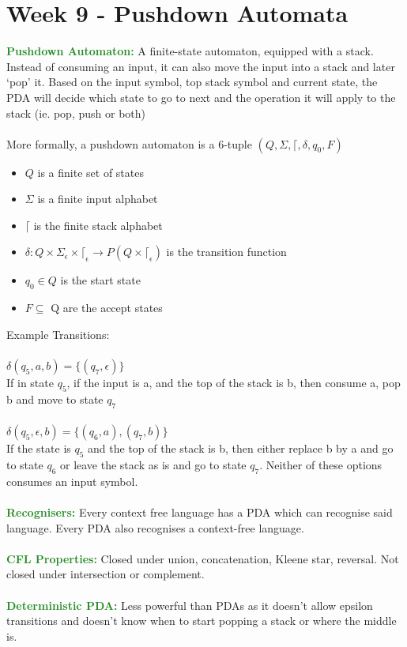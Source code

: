 \documentclass[a4paper,10pt]{article}
\begin{document}
\section*{Week 9 - Pushdown Automata}
\textcolor{ForestGreen}{\textbf{Pushdown Automaton:}} A finite-state automaton, equipped with a stack. Instead of consuming an input, it can also move the input into a stack and later `pop' it. Based on the input symbol, top stack symbol and current state, the PDA will decide which state to go to next and the operation it will apply to the stack (ie. pop, push or both) \\\\
More formally, a pushdown automaton is a 6-tuple $(Q, \Sigma, \lceil, \delta, q_{0}, F)$
\renewcommand{\labelitemi}{\textperiodcentered}
\begin{itemize}
\item $Q$ is a finite set of states 
\item $\Sigma$ is a finite input alphabet 
\item $\lceil$ is the finite stack alphabet 
\item $\delta: Q \times \Sigma_{\epsilon} \times \lceil_{\epsilon} \rightarrow P(Q \times \lceil_{\epsilon})$ is the transition function 
\item $q_{0} \in Q$ is the start state 
\item $F \subseteq$ Q are the accept states \\
\end{itemize}
Example Transitions: \\\\
$\delta(q_{5}, a, b) = \{(q_{7}, \epsilon)\}$ \\ 
If in state $q_{5}$, if the input is a, and the top of the stack is b, then consume a, pop b and move to state $q_{7}$ \\\\ 
$\delta(q_{5}, \epsilon, b) = \{(q_{6}, a), (q_{7}, b)\}$ \\ 
If the state is $q_{5}$ and the top of the stack is b, then either replace b by a and go to state $q_{6}$ or leave the stack as is and go to state $q_{7}$. Neither of these options consumes an input symbol. \\\\
\textcolor{ForestGreen}{\textbf{Recognisers:}} Every context free language has a PDA which can recognise said language. Every PDA also recognises a context-free language.\\\\
\textcolor{ForestGreen}{\textbf{CFL Properties:}} Closed under union, concatenation, Kleene star, reversal. Not closed under intersection or complement.\\\\
\textcolor{ForestGreen}{\textbf{Deterministic PDA:}} Less powerful than PDAs as it doesn't allow epsilon transitions and doesn't know when to start popping a stack or where the middle is. 
\newpage
\end{document}
